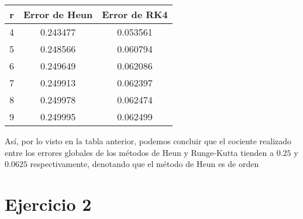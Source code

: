 \documentclass{article}
\begin{document}
\begin{center}
\begin{tabular}{||c c c||}
 \hline
 r & Error de Heun & Error de RK4 \\ [0.5ex]
 \hline\hline
 4 & 0.243477 & 0.053561 \\
 \hline
 5 & 0.248566 & 0.060794 \\
 \hline
 6 & 0.249649 & 0.062086 \\
 \hline
 7 & 0.249913 & 0.062397 \\
 \hline
 8 & 0.249978 & 0.062474 \\
 \hline
 9 & 0.249995 & 0.062499 \\ [1ex]
 \hline
\end{tabular}
\end{center}

Así, por lo visto en la tabla anterior, podemos concluir que el cociente realizado entre los errores globales de los métodos de Heun y Runge-Kutta tienden a $0.25$ y $0.0625$ respectivamente, denotando que el método de Heun es de orden

\section*{Ejercicio 2}
\end{document}
